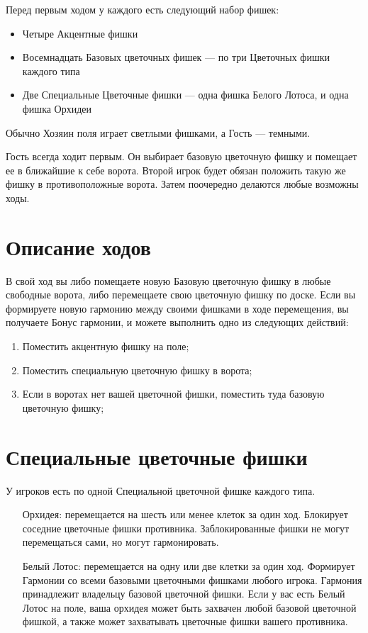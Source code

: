 \documentclass[a4paper,12pt]{diplom}
\begin{document}
Перед первым ходом у каждого есть следующий набор фишек:
\begin{itemize}
	\item Четыре Акцентные фишки
	\item Восемнадцать Базовых цветочных фишек — по три Цветочных фишки каждого типа
	\item Две Специальные Цветочные фишки — одна фишка Белого Лотоса, и одна фишка Орхидеи
\end{itemize}

Обычно Хозяин поля играет светлыми фишками, а Гость — темными.

Гость всегда ходит первым. Он выбирает базовую цветочную фишку и помещает ее в ближайшие к себе ворота. Второй игрок будет обязан положить такую же фишку в противоположные ворота. Затем поочередно делаются любые возможны ходы.

\section{Описание ходов}

В свой ход вы либо помещаете новую Базовую цветочную фишку в любые свободные ворота, либо перемещаете свою цветочную фишку по доске. Если вы формируете новую гармонию между своими фишками в ходе перемещения, вы получаете Бонус гармонии, и можете выполнить одно из следующих действий:
\begin{enumerate}[label=\arabic{enumi})]
	\item Поместить акцентную фишку на поле;
	\item Поместить специальную цветочную фишку в ворота;
	\item Если в воротах нет вашей цветочной фишки, поместить туда базовую цветочную фишку;
\end{enumerate}

\section{Специальные цветочные фишки}

У игроков есть по одной Специальной цветочной фишке каждого типа.

\begin{enumerate}
	\item[Орхидея:] перемещается на шесть или менее клеток за один ход. Блокирует соседние цветочные фишки противника. Заблокированные фишки не могут перемещаться сами, но могут гармонировать.
	\item[Белый Лотос:] перемещается на одну или две клетки за один ход. Формирует Гармонии со всеми базовыми цветочными фишками любого игрока. Гармония принадлежит владельцу базовой цветочной фишки. Если у вас есть Белый Лотос на поле, ваша орхидея может быть захвачен любой базовой цветочной фишкой, а также может захватывать цветочные фишки вашего противника.
\end{enumerate}
\end{document}
